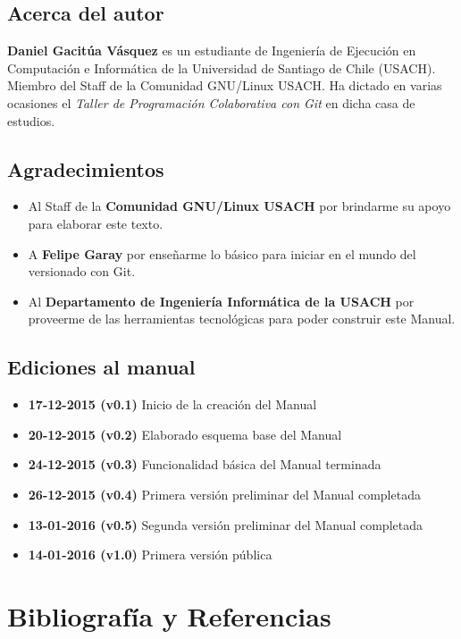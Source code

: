 \documentclass{article}
\begin{document}
\subsection{Acerca del autor}

\textbf{Daniel Gacitúa Vásquez} es un estudiante de Ingeniería de Ejecución en Computación e Informática de la Universidad de Santiago de Chile (USACH). Miembro del Staff de la Comunidad GNU/Linux USACH. Ha dictado en varias ocasiones el \textit{Taller de Programación Colaborativa con Git} en dicha casa de estudios.

\subsection{Agradecimientos}

\begin{itemize}
\item Al Staff de la \textbf{Comunidad GNU/Linux USACH} por brindarme su apoyo para elaborar este texto.
\item A \textbf{Felipe Garay} por enseñarme lo básico para iniciar en el mundo del versionado con Git.
\item Al \textbf{Departamento de Ingeniería Informática de la USACH} por proveerme de las herramientas tecnológicas para poder construir este Manual.
\end{itemize}

\subsection{Ediciones al manual}
\begin{itemize}
\item \textbf{17-12-2015 (v0.1)} Inicio de la creación del Manual
\item \textbf{20-12-2015 (v0.2)} Elaborado esquema base del Manual
\item \textbf{24-12-2015 (v0.3)} Funcionalidad básica del Manual terminada
\item \textbf{26-12-2015 (v0.4)} Primera versión preliminar del Manual completada
\item \textbf{13-01-2016 (v0.5)} Segunda versión preliminar del Manual completada
\item \textbf{14-01-2016 (v1.0)} Primera versión pública
\end{itemize}

\pagebreak

\section{Bibliografía y Referencias}
\printbibliography[heading=none]
\end{document}
